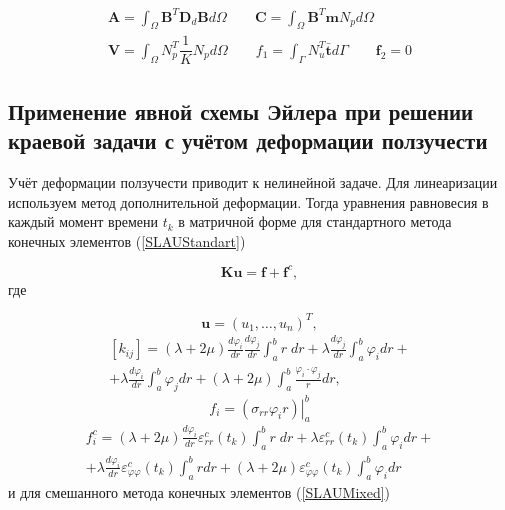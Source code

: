\documentclass[a4paper,14pt]{extarticle}
\begin{document}
\begin{equation}
\begin{split}
\mathbf{A}=\int_{\Omega} {\mathbf{B}^{T} \mathbf{D}_{d} \mathbf{B} d\Omega} \qquad \mathbf{C}=\int_{\Omega} {\mathbf{B}^{T} \mathbf{m} N_{p} d\Omega} \\
\mathbf{V}=\int_{\Omega} {N_{p}^{T} \dfrac{1}{K} N_{p} d\Omega} \qquad f_1=\int_{\Gamma} {N_{u}^{T} \bar{\mathbf{t}}d\Gamma} \qquad \mathbf{f}_2=0
\end{split}
\end{equation}


\newpage


\subsection{Применение явной схемы Эйлера при решении краевой задачи с учётом деформации ползучести}
\normalsize
Учёт деформации ползучести приводит к нелинейной задаче. Для линеаризации используем метод дополнительной деформации. Тогда уравнения равновесия в каждый момент времени $t_{k}$ в матричной форме для стандартного метода конечных элементов (\ref{SLAUStandart})

\begin{equation}\label{SLAUStandartCSEx}
\textbf{Ku}=\textbf{f}+\textbf{f}^{c},
\end{equation}
где 

\begin{equation*}
\mathbf{u}=\left(u_1,\ldots,u_n\right)^T,
\end{equation*}
\begin{equation*}
\begin{gathered}
\left[k_{ij}\right]=(\lambda+2\mu)\frac{d\varphi_i}{d r}\frac{d\varphi_j}{d r}\int_a^b{r\;dr}+\lambda\frac{d\varphi_j}{d r}\int_a^b{\varphi_i dr}+\\
+\lambda\frac{d\varphi_i}{d r}\int_a^b{\varphi_j dr}+(\lambda+2\mu)\int_a^b{\frac{\varphi_i \cdot \varphi_j}{r}dr},
\end{gathered}
\end{equation*}
\begin{equation*}
f_i=\left. (\sigma_{rr} \varphi_i r)\right|_a^b
\end{equation*}
\begin{equation*}
\begin{gathered}
f_i^{c}=(\lambda+2\mu)\frac{d\varphi_i}{d r}\varepsilon^{c}_{rr}(t_{k})\int_a^b{r\;dr}+\lambda\varepsilon^{c}_{rr}(t_{k})\int_a^b{\varphi_i dr} + \\
+\lambda\frac{d\varphi_i}{d r}\varepsilon^{c}_{\varphi\varphi}(t_{k})\int_a^b{r dr}+(\lambda+2\mu)\varepsilon^{c}_{\varphi\varphi}(t_{k})\int_a^b{\varphi_i dr}
\end{gathered}	
\end{equation*}
и для смешанного метода конечных элементов (\ref{SLAUMixed}) 
\end{document}
